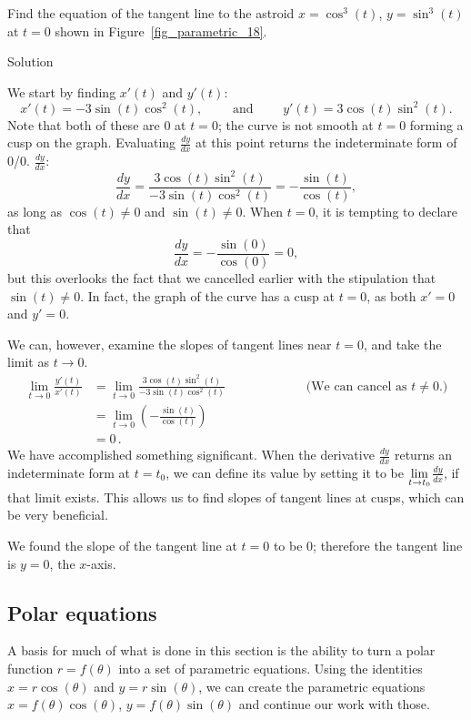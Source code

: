 \begin{example}\label{ex_parcalc3}
Find the equation of the tangent line to the astroid $x=\cos^3 (t)$, $y=\sin^3(t)$ at $t=0$ shown in Figure~\ref{fig_parametric_18}.

Solution 

We start by finding $x'(t)$ and $y'(t)$:
$$ x'(t) = -3\sin (t)\cos^2(t),\qquad \text{ and }\qquad y'(t) = 3\cos (t)\sin^2(t).$$
Note that both of these are 0 at $t=0$; the curve is not smooth at $t=0$ forming a cusp on the graph. Evaluating $\frac{dy}{dx}$ at this point returns the indeterminate form of 0/0. 
$\frac{dy}{dx}$:
$$\frac{dy}{dx} = \frac{3\cos (t)\sin^2(t)}{-3\sin (t)\cos^2(t)} = -\frac{\sin (t)}{\cos (t)},$$ as long as $\cos (t)\neq 0$ and $\sin (t)\neq 0$. When $t=0$, it is tempting to declare that $$\frac{dy}{dx} = -\frac{\sin (0)}{\cos (0)} = 0,$$ but this overlooks the fact that we cancelled earlier with the stipulation that $\sin (t)\neq 0$. In fact, the graph of the curve has a cusp at $t=0$, as both $x'=0$ and $y'=0$. 

We can, however, examine the slopes of tangent lines near $t=0$, and take the limit as $t\to 0$. 
\begin{align*}
\lim_{t\to0} \frac{y'(t)}{x'(t)} &=\lim_{t\to0} \frac{3\cos (t)\sin^2(t)}{-3\sin (t)\cos^2(t)} \qquad\qquad\qquad \text{ (We can cancel as $t\neq 0$.)}\\[0.2cm]
					&= \lim_{t\to0} \left(-\frac{\sin (t)}{\cos (t)}\right)\\[0.2cm]
					&= 0\,.
\end{align*}
We have accomplished something significant. When the derivative $\frac{dy}{dx}$ returns an indeterminate form at $t=t_0$, we can define its value by setting it to be $\displaystyle \lim_{t\to t_0} $$\frac{dy}{dx}$, if that limit exists. This allows us to find slopes of tangent lines at cusps, which can be very beneficial. 

We found the slope of the tangent line at $t=0$ to be 0; therefore the tangent line is $y=0$, the $x$-axis.
\end{example}



\subsection{Polar equations}
A basis for much of what is done in this section is the ability to turn a polar function $r=f(\theta)$ into a set of parametric equations. Using the identities $x=r\cos (\theta)$ and $y=r\sin (\theta)$, we can create the parametric equations $x=f(\theta)\cos(\theta)$, $y=f(\theta)\sin(\theta)$ and continue our work with those. 

